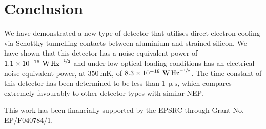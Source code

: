 \documentclass[aip, apl, a4paper, amsmath,amssymb, reprint]{revtex4-1}
\begin{document}
\section{Conclusion}\label{sec:conclusion}
We have demonstrated a new type of detector that utilises direct electron cooling via Schottky tunnelling contacts between aluminium and strained silicon. We have shown that this detector has a noise equivalent power of $1.1 \times 10^{-16}~\mathrm{\mbox{W\,Hz}^{\nicefrac{-1}{2}}}$ and under low optical loading conditions has an electrical noise equivalent power, at $350~\mathrm{mK}$, of $8.3 \times 10^{-18}~\mathrm{\mbox{W\,Hz}^{\nicefrac{-1}{2}}}$. The time constant of this detector has been determined to be less than $1~\mathrm{\upmu s}$, which compares extremely favourably to other detector types with similar NEP.

This work has been financially supported by the EPSRC through Grant No. EP/F040784/1.

\end{document}
